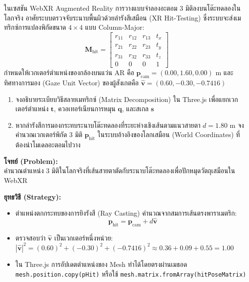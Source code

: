\begin{psctexample}
ในเซสชัน WebXR Augmented Reality การวางแบบจำลองอะตอม 3 มิติลงบนโต๊ะทดลองในโลกจริง อาศัยระบบตรวจจับระนาบพื้นผิวด้วยลำรังสีเสมือน (XR Hit-Testing) ซึ่งระบบจะส่งเมทริกซ์การแปลงพิกัดขนาด $4 \times 4$ แบบ Column-Major:
\begin{equation}
\mathbf{M}_{\text{hit}} = \begin{bmatrix}
r_{11} & r_{12} & r_{13} & t_x \\
r_{21} & r_{22} & r_{23} & t_y \\
r_{31} & r_{32} & r_{33} & t_z \\
0 & 0 & 0 & 1
\end{bmatrix}
\end{equation}
กำหนดให้เวกเตอร์ตำแหน่งของกล้องบนแว่น AR คือ $\mathbf{p}_{\text{cam}} = (0.00, 1.60, 0.00)\text{ m}$ และทิศทางการมอง (Gaze Unit Vector) ของผู้สังเกตคือ $\hat{\mathbf{v}} = (0.60, -0.30, -0.7416)$
\begin{enumerate}
    \item จงอธิบายระเบียบวิธีสลายเมทริกซ์ (Matrix Decomposition) ใน Three.js เพื่อแยกเวกเตอร์ตำแหน่ง $\mathbf{t}$, ควอเทอร์เนียนการหมุน $\mathbf{q}$, และสเกล $\mathbf{s}$
    \item หากลำรังสีการมองกระทบระนาบโต๊ะทดลองที่ระยะห่างเชิงเส้นตามแนวสายตา $d = 1.80\text{ m}$ จงคำนวณเวกเตอร์พิกัด 3 มิติ $\mathbf{p}_{\text{hit}}$ ในระบบอ้างอิงของโลกเสมือน (World Coordinates) ที่ต้องนำโมเดลอะตอมไปวาง
\end{enumerate}

\textbf{โจทย์ (Problem):} \\
คำนวณตำแหน่ง 3 มิติในโลกจริงที่เส้นสายตาตัดกับระนาบโต๊ะทดลองเพื่อปักหมุดวัตถุเสมือนใน WebXR

\textbf{ยุทธวิธี (Strategy):} \\
\begin{itemize}
    \item ตำแหน่งตกกระทบของการยิงรังสี (Ray Casting) คำนวณจากสมการเส้นตรงพาราเมตริก:
    \begin{equation}
    \mathbf{p}_{\text{hit}} = \mathbf{p}_{\text{cam}} + d \hat{\mathbf{v}}
    \end{equation}
    \item ตรวจสอบว่า $\hat{\mathbf{v}}$ เป็นเวกเตอร์หนึ่งหน่วย: $|\hat{\mathbf{v}}|^2 = (0.60)^2 + (-0.30)^2 + (-0.7416)^2 \approx 0.36 + 0.09 + 0.55 = 1.00$
    \item ใน Three.js การอัปเดตตำแหน่งของ Mesh ทำได้โดยตรงผ่านเมธอด \texttt{mesh.position.copy(pHit)} หรือใช้ \texttt{mesh.matrix.fromArray(hitPoseMatrix)}
\end{itemize}


\end{psctexample}

